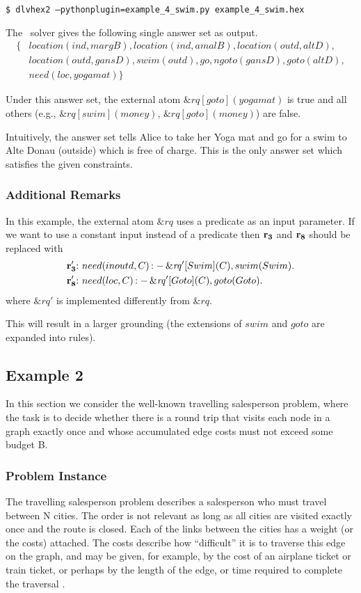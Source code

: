 \documentclass[a4paper, titlepage]{article}
\newcommand{\ext}[3]{\ensuremath{\&{\mathit{#1}}[#2](#3)}}
\DeclareMathOperator{\leftimpl}{:-}
\newcommand\leftaligned[1]{\par \smallskip \noindent \qquad #1 \smallskip \par}
\newcommand{\row}[1]{%
  \ensuremath{\color{black}\ensuremath{\mathbf{#1}} \color{black}}%
}
\newcommand{\rowprefix}[1]{%
  \ensuremath{\color{black}\mathbf{#1{:}}\ }%
}
\begin{document}
\leftaligned{\texttt{\$ dlvhex2 --pythonplugin=example\_4\_swim.py example\_4\_swim.hex}}

\noindent
The \dlvhex\ solver gives the following single answer set as output.
\begin{align*}
\{ & location(ind,margB),location(ind,amalB),location(outd,altD), \\
   & location(outd,gansD), swim(outd),go,ngoto(gansD),goto(altD),\\
   & need(loc,yogamat) \} 
\end{align*}

Under this answer set, the external atom
$\ext{rq}{goto}{yogamat}$ is true and all others
(e.g., $\ext{rq}{swim}{money}$, $\ext{rq}{goto}{money}$)
are false.

Intuitively, the answer set tells Alice to 
take her Yoga mat and go for a swim to Alte Donau (outside) 
which is free of charge. This is the only answer set which 
satisfies the given constraints.    

\subsubsection{Additional Remarks}

In this example, the external atom 
$\mathit{\&rq}$ uses a predicate as an input parameter.
If we want to use a constant input
instead of a predicate then
\row{r_3} and \row{r_8} should be replaced with
\begin{align*}
\rowprefix{r_3'}& need(inoutd, C) \leftimpl \ext{rq'}{Swim}{C}, swim(Swim). \\
\rowprefix{r_8'}& need(loc, C) \leftimpl \ext{rq'}{Goto}{C}, goto(Goto).
\end{align*}    
where $\&rq'$ is implemented differently from $\&rq$.

This will result in a larger grounding
(the extensions of $swim$ and $goto$ are expanded into rules).

\subsection{Example 2}
\label{traveling}
In this section we consider the well-known travelling 
salesperson problem, where the task is to decide whether there 
is a round trip that visits each node in a graph exactly 
once and whose accumulated edge costs must not exceed some 
budget B.

\subsubsection{Problem Instance}
The travelling salesperson problem describes a salesperson who 
must travel between N cities. The order is not relevant as long as all cities are visited exactly once and the route is closed. Each of the 
links between the cities has a weight (or the 
costs) attached. The costs describe how ``difficult'' it is to 
traverse this edge on the graph, and may be given, for 
example, by the cost of an airplane ticket or train ticket, 
or perhaps by the length of the edge, or time required to 
complete the traversal \cite{wiki}.
\end{document}
